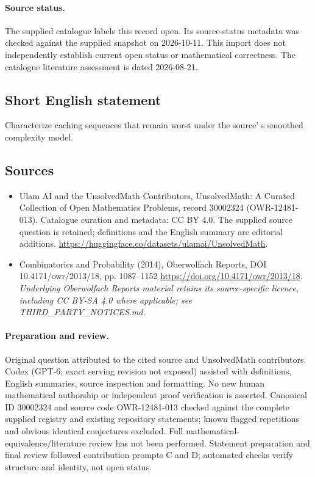 \documentclass[11pt]{article}
\begin{document}
\paragraph{Source status.}
The supplied catalogue labels this record open. Its source-status metadata was checked against the supplied snapshot on 2026-10-11. This import does not independently establish current open status or mathematical correctness. The catalogue literature assessment is dated 2026-08-21.
\subsection{Short English statement}
Characterize caching sequences that remain worst under the source' s smoothed complexity model.
\subsection{Sources}
\begin{itemize}
\item[S1] Ulam AI and the UnsolvedMath Contributors, UnsolvedMath: A Curated Collection of Open Mathematics Problems, record 30002324 (OWR-12481-013). Catalogue curation and metadata: CC BY 4.0. The supplied source question is retained; definitions and the English summary are editorial additions.
\url{https://huggingface.co/datasets/ulamai/UnsolvedMath}.
\item[S2] Combinatorics and Probability (2014), Oberwolfach Reports, DOI 10.4171/owr/2013/18, pp. 1087--1152
\url{https://doi.org/10.4171/owr/2013/18}.
\textit{Underlying Oberwolfach Reports material retains its source-specific licence, including CC BY-SA 4.0 where applicable; see THIRD\_PARTY\_NOTICES.md.}
\end{itemize}
\paragraph{Preparation and review.}
Original question attributed to the cited source and UnsolvedMath contributors. Codex (GPT-6; exact serving revision not exposed) assisted with definitions, English summaries, source inspection and formatting. No new human mathematical authorship or independent proof verification is asserted. Canonical ID 30002324 and source code OWR-12481-013 checked against the complete supplied registry and existing repository statements; known flagged repetitions and obvious identical conjectures excluded. Full mathematical-equivalence/literature review has not been performed. Statement preparation and final review followed contribution prompts C and D; automated checks verify structure and identity, not open status.
\label{end:30002324}
\end{document}
